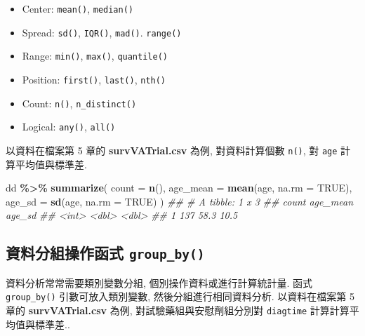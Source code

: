 \documentclass[
]{book}
\newenvironment{Shaded}{\begin{snugshade}}{\end{snugshade}}
\newcommand{\CommentTok}[1]{\textcolor[rgb]{0.56,0.35,0.01}{\textit{#1}}}
\newcommand{\DataTypeTok}[1]{\textcolor[rgb]{0.13,0.29,0.53}{#1}}
\newcommand{\KeywordTok}[1]{\textcolor[rgb]{0.13,0.29,0.53}{\textbf{#1}}}
\newcommand{\NormalTok}[1]{#1}
\newcommand{\OperatorTok}[1]{\textcolor[rgb]{0.81,0.36,0.00}{\textbf{#1}}}
\newcommand{\OtherTok}[1]{\textcolor[rgb]{0.56,0.35,0.01}{#1}}
\newcommand{\StringTok}[1]{\textcolor[rgb]{0.31,0.60,0.02}{#1}}
\providecommand{\tightlist}{%
  \setlength{\itemsep}{0pt}\setlength{\parskip}{0pt}}
\begin{document}
\begin{itemize}
\tightlist
\item
  Center: \texttt{mean()}, \texttt{median()}
\item
  Spread: \texttt{sd()}, \texttt{IQR()}, \texttt{mad()}. \texttt{range()}
\item
  Range: \texttt{min()}, \texttt{max()}, \texttt{quantile()}
\item
  Position: \texttt{first()}, \texttt{last()}, \texttt{nth()}
\item
  Count: \texttt{n()}, \texttt{n\_distinct()}
\item
  Logical: \texttt{any()}, \texttt{all()}
\end{itemize}

以資料在檔案第 5 章的 \textbf{survVATrial.csv} 為例,
對資料計算個數 \texttt{n()},
對 \texttt{age} 計算平均值與標準差.

\begin{Shaded}
\begin{Highlighting}[]
\NormalTok{dd }\OperatorTok{\%\textgreater{}\%}\StringTok{ }
\StringTok{  }\KeywordTok{summarize}\NormalTok{(}
    \DataTypeTok{count =} \KeywordTok{n}\NormalTok{(),}
    \DataTypeTok{age\_mean =} \KeywordTok{mean}\NormalTok{(age, }\DataTypeTok{na.rm =} \OtherTok{TRUE}\NormalTok{),}
    \DataTypeTok{age\_sd =} \KeywordTok{sd}\NormalTok{(age, }\DataTypeTok{na.rm =} \OtherTok{TRUE}\NormalTok{)}
\NormalTok{    )}
\CommentTok{\#\# \# A tibble: 1 x 3}
\CommentTok{\#\#   count age\_mean age\_sd}
\CommentTok{\#\#   \textless{}int\textgreater{}    \textless{}dbl\textgreater{}  \textless{}dbl\textgreater{}}
\CommentTok{\#\# 1   137     58.3   10.5}
\end{Highlighting}
\end{Shaded}

\hypertarget{ux8cc7ux6599ux5206ux7d44ux64cdux4f5cux51fdux5f0f-group_by}{%
\subsection{\texorpdfstring{資料分組操作函式 \texttt{group\_by()}}{資料分組操作函式 group\_by()}}\label{ux8cc7ux6599ux5206ux7d44ux64cdux4f5cux51fdux5f0f-group_by}}

資料分析常常需要類別變數分組, 個別操作資料或進行計算統計量.
函式 \texttt{group\_by()} 引數可放入類別變數, 然後分組進行相同資料分析.
以資料在檔案第 5 章的 \textbf{survVATrial.csv} 為例,
對試驗藥組與安慰劑組分別對 \texttt{diagtime} 計算計算平均值與標準差..
\end{document}
